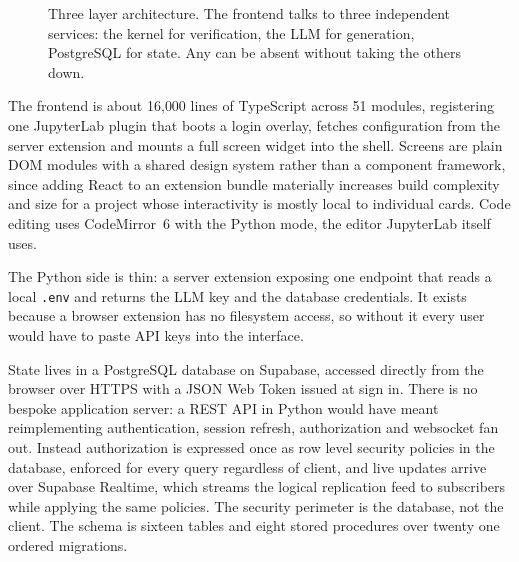 \documentclass[manuscript]{acmart}
\begin{document}
\begin{figure}[t]
\caption{Three layer architecture. The frontend talks to three independent
services: the kernel for verification, the LLM for generation, PostgreSQL for
state. Any can be absent without taking the others down.}
\label{fig:arch}
\end{figure}

The frontend is about 16{,}000 lines of TypeScript across 51 modules,
registering one JupyterLab plugin that boots a login overlay, fetches
configuration from the server extension and mounts a full screen widget into
the shell. Screens are plain DOM modules with a shared design system rather
than a component framework, since adding React to an extension bundle
materially increases build complexity and size for a project whose
interactivity is mostly local to individual cards. Code editing uses
CodeMirror~6 with the Python mode, the editor JupyterLab itself uses.

The Python side is thin: a server extension exposing one endpoint that reads a
local \texttt{.env} and returns the LLM key and the database credentials. It
exists because a browser extension has no filesystem access, so without it
every user would have to paste API keys into the interface.

State lives in a PostgreSQL database on Supabase, accessed directly from the
browser over HTTPS with a JSON Web Token issued at sign in. There is no bespoke
application server: a REST API in Python would have meant reimplementing
authentication, session refresh, authorization and websocket fan out. Instead
authorization is expressed once as row level security policies in the database,
enforced for every query regardless of client, and live updates arrive over
Supabase Realtime, which streams the logical replication feed to subscribers
while applying the same policies. The security perimeter is the database, not
the client. The schema is sixteen tables and eight stored procedures over
twenty one ordered migrations.
\end{document}

